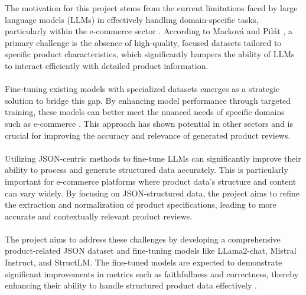 The motivation for this project stems from the current limitations faced by large language models (LLMs) in effectively handling domain-specific tasks, particularly within the e-commerce sector \cite{Wang2023Emotional}. According to Macková and Pilát \cite{macková2023promap}, a primary challenge is the absence of high-quality, focused datasets tailored to specific product characteristics, which significantly hampers the ability of LLMs to interact efficiently with detailed product information.
\\\\
Fine-tuning existing models with specialized datasets emerges as a strategic solution to bridge this gap. By enhancing model performance through targeted training, these models can better meet the nuanced needs of specific domains such as e-commerce \cite{Duong2023Analysis}. This approach has shown potential in other sectors and is crucial for improving the accuracy and relevance of generated product reviews.
\\\\
Utilizing JSON-centric methods to fine-tune LLMs can significantly improve their ability to process and generate structured data accurately. This is particularly important for e-commerce platforms where product data's structure and content can vary widely. By focusing on JSON-structured data, the project aims to refine the extraction and normalization of product specifications, leading to more accurate and contextually relevant product reviews.
\\\\
The project aims to address these challenges by developing a comprehensive product-related JSON dataset and fine-tuning models like LLama2-chat, Mistral Instruct, and StructLM. The fine-tuned models are expected to demonstrate significant improvements in metrics such as faithfullness and correctness, thereby enhancing their ability to handle structured product data effectively \cite{Suri2023Do}.